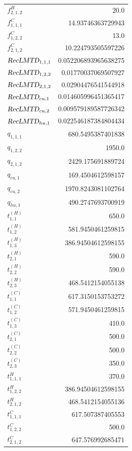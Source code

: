 \documentclass{article}%
\begin{document}
\begin{multicols*}{3}
\begin{supertabular}{lr}
	$f_{2,1,2}^{H}$ & 20.0 \\%
	$f_{1,1,1}^{C}$ & 14.93746363729943 \\%
	$f_{1,2,2}^{C}$ & 13.0 \\%
	$f_{2,1,2}^{C}$ & 10.224793505597226 \\%
	$\textsl{RecLMTD}_{1,1,1}$ & 0.052206893965638275 \\%
	$\textsl{RecLMTD}_{1,2,2}$ & 0.01770037069507927 \\%
	$\textsl{RecLMTD}_{2,1,2}$ & 0.02904476541544918 \\%
	$\textsl{RecLMTD}_{cu,1}$ & 0.014605996451365417 \\%
	$\textsl{RecLMTD}_{cu,2}$ & 0.009579189587726342 \\%
	$\textsl{RecLMTD}_{hu,1}$ & 0.022546187384804434 \\%
	$q_{1,1,1}$ & 680.5495387401838 \\%
	$q_{1,2,2}$ & 1950.0 \\%
	$q_{2,1,2}$ & 2429.175691889724 \\%
	$q_{cu,1}$ & 169.4504612598157 \\%
	$q_{cu,2}$ & 1970.8243081102764 \\%
	$q_{hu,1}$ & 490.2747693700919 \\%
	$t_{1,1}^{(H)}$ & 650.0 \\%
	$t_{1,2}^{(H)}$ & 581.9450461259815 \\%
	$t_{1,3}^{(H)}$ & 386.94504612598155 \\%
	$t_{2,1}^{(H)}$ & 590.0 \\%
	$t_{2,2}^{(H)}$ & 590.0 \\%
	$t_{2,3}^{(H)}$ & 468.5412154055138 \\%
	$t_{1,1}^{(C)}$ & 617.3150153753272 \\%
	$t_{1,2}^{(C)}$ & 571.9450461259815 \\%
	$t_{1,3}^{(C)}$ & 410.0 \\%
	$t_{2,1}^{(C)}$ & 500.0 \\%
	$t_{2,2}^{(C)}$ & 500.0 \\%
	$t_{2,3}^{(C)}$ & 350.0 \\%
	$t_{1,1,1}^{H}$ & 370.0 \\%
	$t_{1,2,2}^{H}$ & 386.94504612598155 \\%
	$t_{2,1,2}^{H}$ & 468.5412154055136 \\%
	$t_{1,1,1}^{C}$ & 617.507387405553 \\%
	$t_{1,2,2}^{C}$ & 500.0 \\%
	$t_{2,1,2}^{C}$ & 647.576992685471 \\%

\end{supertabular}
\end{multicols*}
\end{document}
